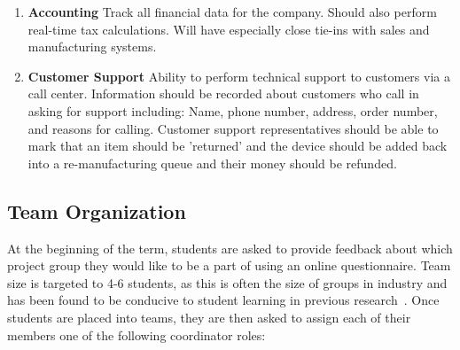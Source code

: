 \documentclass{sig-alternate-05-2015}
\begin{document}
\begin{enumerate}
\begin{enumerate}
	\end{enumerate}


\item \textbf{Accounting} Track all financial data for the company. Should also perform real-time tax calculations. Will have especially close tie-ins with sales and manufacturing systems.
\item \textbf{Customer Support} Ability to perform technical support to customers via a call center. Information should be recorded about customers who call in asking for support including: Name, phone number, address, order number, and reasons for calling. Customer support representatives should be able to mark that an item should be 'returned' and the device should be added back into a re-manufacturing queue and their money should be refunded.


\end{enumerate}

%	


\subsection{Team Organization}


At the beginning of the term, students are asked to provide feedback about which project group they would like to be a part of using an online questionnaire. Team size is targeted to 4-6 students, as this is often the size of groups in industry and has been found to be conducive to student learning in previous research~\cite{Guo:2009:GPS:1516546.1516579, Petkovic:2006:TPS:1140124.1140202}. Once students are placed into teams, they are then asked to assign each of their members one of the following coordinator roles:
\end{document}
